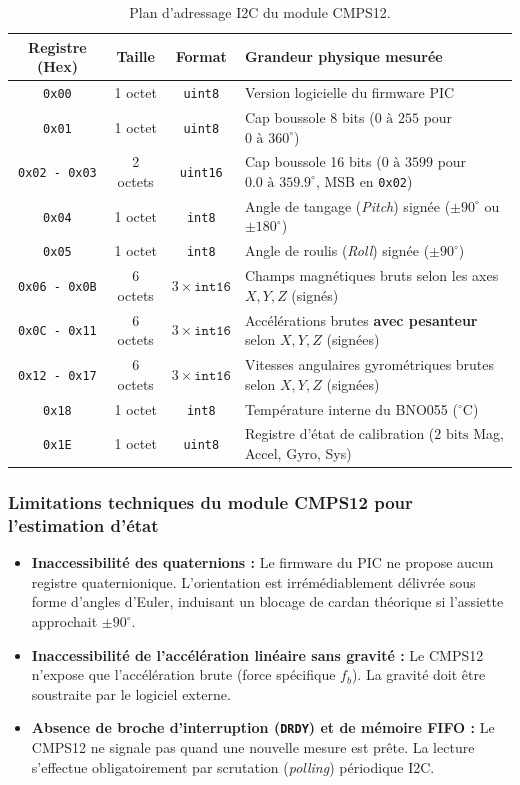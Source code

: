 \documentclass[../Materiel.tex]{subfiles}
\begin{document}
\begin{table}[htbp]
\centering
\small
\begin{tabular}{cccl}
\toprule
\textbf{Registre (Hex)} & \textbf{Taille} & \textbf{Format} & \textbf{Grandeur physique mesurée} \\
\midrule
\texttt{0x00} & 1 octet & \texttt{uint8} & Version logicielle du firmware PIC \\
\texttt{0x01} & 1 octet & \texttt{uint8} & Cap boussole 8 bits ($0\text{ à }255$ pour $0\text{ à }360^\circ$) \\
\texttt{0x02 - 0x03} & 2 octets & \texttt{uint16} & Cap boussole 16 bits ($0\text{ à }3599$ pour $0.0\text{ à }359.9^\circ$, MSB en \texttt{0x02}) \\
\texttt{0x04} & 1 octet & \texttt{int8} & Angle de tangage (\textit{Pitch}) signée ($\pm 90^\circ$ ou $\pm 180^\circ$) \\
\texttt{0x05} & 1 octet & \texttt{int8} & Angle de roulis (\textit{Roll}) signée ($\pm 90^\circ$) \\
\texttt{0x06 - 0x0B} & 6 octets & $3 \times \texttt{int16}$ & Champs magnétiques bruts selon les axes $X, Y, Z$ (signés) \\
\texttt{0x0C - 0x11} & 6 octets & $3 \times \texttt{int16}$ & Accélérations brutes \textbf{avec pesanteur} selon $X, Y, Z$ (signées) \\
\texttt{0x12 - 0x17} & 6 octets & $3 \times \texttt{int16}$ & Vitesses angulaires gyrométriques brutes selon $X, Y, Z$ (signées) \\
\texttt{0x18} & 1 octet & \texttt{int8} & Température interne du BNO055 ($^\circ\text{C}$) \\
\texttt{0x1E} & 1 octet & \texttt{uint8} & Registre d'état de calibration ($2\text{ bits}$ Mag, Accel, Gyro, Sys) \\
\bottomrule
\end{tabular}
\caption{Plan d'adressage I2C du module CMPS12.}
\end{table}

\subsubsection{Limitations techniques du module CMPS12 pour l'estimation d'état}
\begin{itemize}
    \item \textbf{Inaccessibilité des quaternions :} Le firmware du PIC ne propose aucun registre quaternionique. L'orientation est irrémédiablement délivrée sous forme d'angles d'Euler, induisant un blocage de cardan théorique si l'assiette approchait $\pm 90^\circ$.
    \item \textbf{Inaccessibilité de l'accélération linéaire sans gravité :} Le CMPS12 n'expose que l'accélération brute (force spécifique $f_b$). La gravité doit être soustraite par le logiciel externe.
    \item \textbf{Absence de broche d'interruption (\texttt{DRDY}) et de mémoire FIFO :} Le CMPS12 ne signale pas quand une nouvelle mesure est prête. La lecture s'effectue obligatoirement par scrutation (\textit{polling}) périodique I2C.
\end{itemize}
\end{document}
